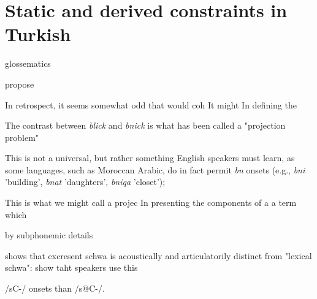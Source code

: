 \chapter{Static and derived constraints in Turkish}
\label{turkish}

glossematics

\citet{Chomsky1965} propose


In retrospect, it seems somewhat odd that \citeauthor{Chomsky1965} would coh
It might 
In defining the 

The contrast between \emph{blick} and \emph{bnick} is what has been called a "projection problem" \citep{Baker1979}

This is not a universal, but rather something English speakers must learn, as some languages, such as Moroccan Arabic, do in fact permit \emph{bn} onsets (e.g., \emph{bni} 'building', \emph{bnat} 'daughters', \emph{bniqa} 'closet'); 


\citet{Lees1966b,Lees1966a}


This is what we might call a projec
In presenting the components of a 
a term which 

by subphonemic details

\citet{Davidson2005,Davidson2006a} shows that excresent schwa is acoustically and articulatorily distinct from "lexical schwa":
\citet{Wilson2011} show taht speakers use this 


/sC-/ onsets than /s@C-/.



\citet{Berent2007a}
\citet{Berent2007b}
\citet{Berent2008a}

\citet{Peperkamp2007}
\citet{Dupoux1999}


